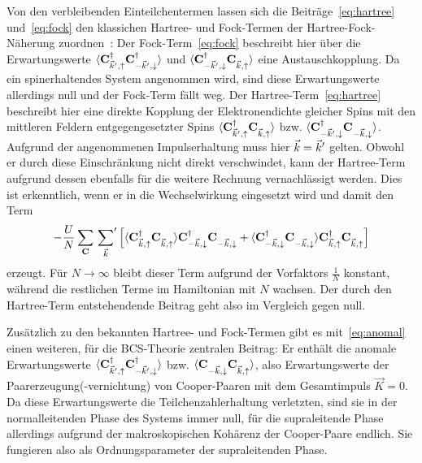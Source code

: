 Von den verbleibenden Einteilchentermen lassen sich die Beiträge~\eqref{eq:hartree} und~\eqref{eq:fock} den klassichen Hartree- und Fock-Termen der Hartree-Fock-Näherung zuordnen~\cite{czycholl_theoretische_2016,bruus_manybody_2004}: 
Der Fock-Term~\eqref{eq:fock} beschreibt hier über die Erwartungswerte $\langle\mathbf{C}^{\dagger}_{{\vec{k}}', \uparrow} \mathbf{C}^{\dagger}_{-{\vec{k}}',\downarrow}\rangle$ und $\expval{\ocdd \ocndu}$ eine Austauschkopplung.
Da ein spinerhaltendes System angenommen wird, sind diese Erwartungswerte allerdings null und der Fock-Term fällt weg.
Der Hartree-Term~\eqref{eq:hartree} beschreibt hier eine direkte Kopplung der Elektronendichte gleicher Spins mit den mittleren Feldern entgegengesetzter Spins $\expval{\ocdu \ocndu}$ bzw. $\expval{\ocdd \ocndd}$. 
Aufgrund der angenommenen Impulserhaltung muss hier ${\vec{k}}={\vec{k}}'$ gelten.
Obwohl er durch diese Einschränkung nicht direkt verschwindet, kann der Hartree-Term aufgrund dessen ebenfalls für die weitere Rechnung vernachlässigt werden.
Dies ist erkenntlich, wenn er in die Wechselwirkung eingesetzt wird und damit den Term
\begin{align}
        -\frac{U}{N} \sum_\oC \sump{\vk} \left[\expval{\ocd{\vk, \up} \oc{\vk, \up}} \ocd{-\vk, \down} \ocndd + \expval{\ocd{-\vk, \down} \ocndd} \ocd{\vk, \up} \ocndu\right]
\end{align}
erzeugt. 
Für $N \rightarrow \infty$ bleibt dieser Term aufgrund der Vorfaktors $\frac{1}{N}$ konstant, während die restlichen Terme im Hamiltonian mit $N$ wachsen.
Der durch den Hartree-Term entstehendende Beitrag geht also im Vergleich gegen null.

Zusätzlich zu den bekannten Hartree- und Fock-Termen gibt es mit~\eqref{eq:anomal} einen weiteren, für die BCS-Theorie zentralen Beitrag: 
Er enthält die anomale Erwartungswerte $\langle\mathbf{C}^{\dagger}_{{\vec{k}}', \uparrow} \mathbf{C}^{\dagger}_{-{\vec{k}}',\downarrow}\rangle$ bzw. $\expval{\ocndd \ocndu}$, also Erwartungswerte der Paarerzeugung(-vernichtung) von Cooper-Paaren mit dem Gesamtimpuls $\vec{K} = 0$. 
Da diese Erwartungswerte die Teilchenzahlerhaltung verletzten, sind sie in der normalleitenden Phase des Systems immer null, für die supraleitende Phase allerdings aufgrund der makroskopischen Kohärenz der Cooper-Paare endlich.
Sie fungieren also als Ordnungsparameter der supraleitenden Phase.

